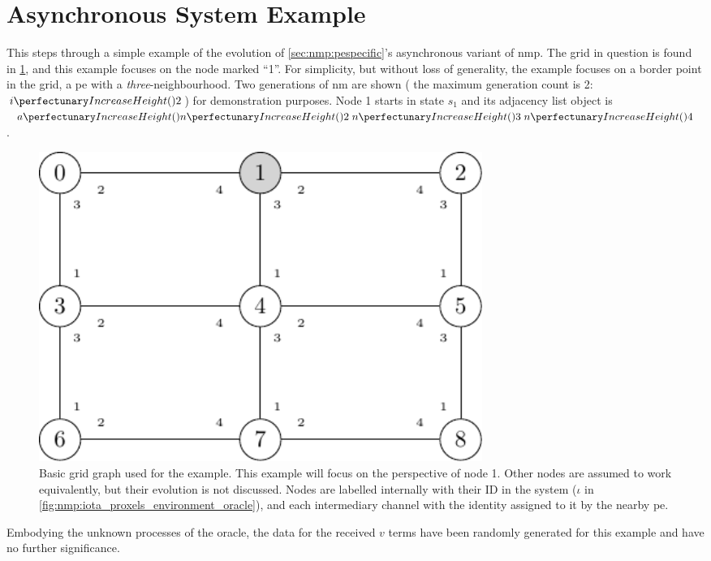 \section{\label{sec:nmp:example}Asynchronous System Example}
\newcommand*{\obinnod}[1]{Objects inside node 1 at the end of round #1}
\newcommand*{\obinrul}[2]{Objects inside node 1 after application of rule#1 during round #2}

This  steps through a simple example of the evolution of \cref{sec:nmp:pespecific}'s asynchronous variant of \gls{nmp}.  The grid in question is found in \cref{fig:nmp:basicgrid}, and this example focuses on the node marked ``1''.  For simplicity, but without loss of generality, the example focuses on a border point in the grid, \ie{} a \gls{pe} with a \emph{three}-neighbourhood.  Two generations of \gls{nm} are shown (\ie{} the maximum generation count is 2: \(\cpfunc{i}{2}\)) for demonstration purposes.  Node 1 starts in state \(s_1\) and its adjacency list object is \(\cpfunc{a}{\cpfunc{n}{2} \; \cpfunc{n}{3} \;\cpfunc{n}{4}}\).

\begin{figure}
    \centering
    \includegraphics[keepaspectratio,width=0.7\textwidth,height=0.3\textheight]{chapters/nmp/images/3by3gridgraph.pdf}
    \caption[Basic  grid graph used for the example]{Basic  grid graph used for the example.  This example will focus on the perspective of node 1.  Other nodes are assumed to work equivalently, but their evolution is not discussed.  Nodes are labelled internally with their ID in the system (\(\iota\) in \cref{fig:nmp:iota_proxels_environment_oracle}), and each intermediary channel with the identity assigned to it by the nearby \gls{pe}.}
    \label{fig:nmp:basicgrid}
\end{figure}

Embodying the unknown processes of the oracle, the data for the received \(v\) terms have been randomly generated for this example and have no further significance.


